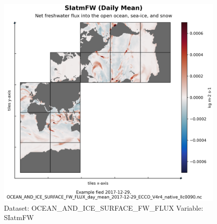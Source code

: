 \begin{figure}[H]
\centering
\includegraphics[width=\textwidth]{../images/plots/native_plots/Ocean_and_Sea-Ice_Surface_Freshwater_Fluxes/SIatmFW.png}
\caption{Dataset: OCEAN\_AND\_ICE\_SURFACE\_FW\_FLUX Variable: SIatmFW}
\label{tab:table-OCEAN_AND_ICE_SURFACE_FW_FLUX_SIatmFW-Plot}
\end{figure}
\pagebreak
